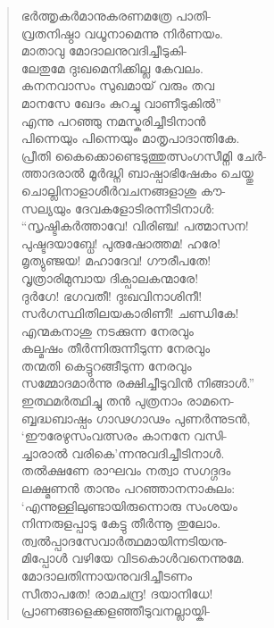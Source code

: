 \begin{verse}
ഭര്‍ത്തൃകര്‍മാനുകരണമത്രേ പാതി-\\
വ്രതനിഷ്ഠാ വധൂനാമെന്നു നിര്‍ണയം.\\
മാതാവു മോദാലനുവദിച്ചീടുകി-\\
ലേതുമേ ദുഃഖമെനിക്കില്ല കേവലം.\\
കനനവാസം സുഖമായ് വരും തവ\\
മാനസേ ഖേദം കുറച്ചു വാണീടുകില്‍”\\
എന്നു പറഞ്ഞു നമസ്കരിച്ചീടിനാന്‍\\
പിന്നെയും പിന്നെയും മാതൃപാദാന്തികേ.\\
പ്രീതി കൈക്കൊണ്ടെടുത്തുത്സംഗസീമ്നി ചേര്‍-\\
ത്താദരാല്‍ മൂര്‍ദ്ധ്നി ബാഷ്പാഭിഷേകം ചെയ്തു\\
ചൊല്ലിനാളാശീര്‍വചനങ്ങളാശു കൗ-\\
സല്യയും ദേവകളോടിരന്നീടിനാള്‍:\\
“സൃഷ്ടികര്‍ത്താവേ! വിരിഞ്ച! പത്മാസന!\\
പുഷ്ടദയാബ്ധേ! പുരുഷോത്തമ! ഹരേ!\\
മൃത്യുഞ്ജയ! മഹാദേവ! ഗൗരീപതേ!\\
വൃത്രാരിമുമ്പായ ദിക്പാലകന്മാരേ!\\
ദുര്‍ഗേ! ഭഗവതീ! ദുഃഖവിനാശിനീ!\\
സര്‍ഗസ്ഥിതിലയകാരിണീ! ചണ്ഡികേ!\\
എന്മകനാശു നടക്കുന്ന നേരവും\\
കല്മഷം തീര്‍ന്നിരുന്നീടുന്ന നേരവും\\
തന്മതി കെട്ടുറങ്ങീടുന്ന നേരവും\\
സമ്മോദമാര്‍ന്നു രക്ഷിച്ചീടുവിന്‍ നിങ്ങാള്‍.”\\
ഇത്ഥമര്‍ത്ഥിച്ചു തന്‍ പുത്രനാം രാമനെ-\\
ബ്ബദ്ധബാഷ്പം ഗാഢഗാഢം പുണര്‍ന്നുടന്‍,\\
‘ഈരേഴുസംവത്സരം കാനനേ വസി-\\
ച്ചാരാല്‍ വരികെ’ന്നനുവദിച്ചീടിനാള്‍.\\
തല്‍ക്ഷണേ രാഘവം നത്വാ സഗദ്ഗദം\\
ലക്ഷ്മണന്‍ താനും പറഞ്ഞാനനാകുലം:\\
‘എന്നുള്ളിലുണ്ടായിരുന്നൊരു സംശയം\\
നിന്നരുളപ്പാടു കേട്ടു തീര്‍ന്നൂ തുലോം.\\
ത്വല്‍പ്പാദസേവാര്‍ത്ഥമായിന്നടിയനു-\\
മിപ്പോള്‍ വഴിയേ വിടകൊള്‍വനെന്നുമേ.\\
മോദാലതിന്നായനുവദിച്ചീടണം\\
സീതാപതേ! രാമചന്ദ്ര! ദയാനിധേ!\\
പ്രാണങ്ങളെക്കളഞ്ഞീടുവനല്ലായ്കി-\\

\end{verse}
